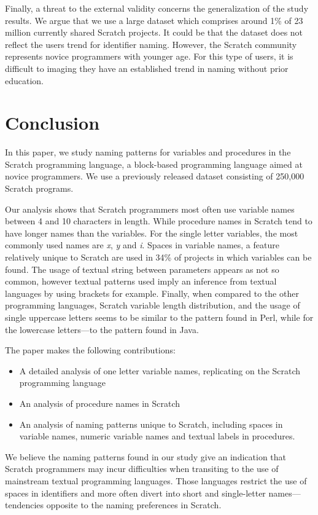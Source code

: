 \documentclass[conference]{IEEEtran}
\begin{document}
Finally, a threat to the external validity concerns the generalization of the study results. We argue that we use a large dataset which comprises around 1\% of 23 million currently shared Scratch projects. It could be that the dataset does not reflect the users trend for identifier naming. However, the Scratch community represents novice programmers with younger age. For this type of users, it is difficult to imaging they have an established trend in naming without prior education.

\section{Conclusion}
In this paper, we study naming patterns for variables and procedures in the Scratch programming language, a block-based programming language aimed at novice programmers. We use a previously released dataset consisting of 250,000 Scratch programs. 

Our analysis shows that Scratch programmers most often use variable names between 4 and 10 characters in length. While procedure names in Scratch tend to have longer names than the variables. For the single letter variables, the most commonly used names are \emph{x}, \emph{y} and \emph{i}. Spaces in variable names, a feature relatively unique to Scratch are used in 34\% of projects in which variables can be found. The usage of textual string between parameters appears as not so common, however textual patterns used imply an inference from textual languages by using brackets for example. Finally, when compared to the other programming languages, Scratch variable length distribution, and the usage of single uppercase letters seems to be similar to the pattern found in Perl, while for the lowercase letters---to the pattern found in Java.

The paper makes the following contributions:
\begin{itemize}
\item A detailed analysis of one letter variable names, replicating \cite{Beniamini} on the Scratch programming language
\item An analysis of procedure names in Scratch
\item An analysis of naming patterns unique to Scratch, including spaces in variable names, numeric variable names and textual labels in procedures.
\end{itemize}

We believe the naming patterns found in our study give an indication that Scratch programmers may incur difficulties when transiting to the use of mainstream textual programming languages. Those languages restrict the use of spaces in identifiers and more often divert into short and single-letter names---tendencies opposite to the naming preferences in Scratch.
\end{document}
